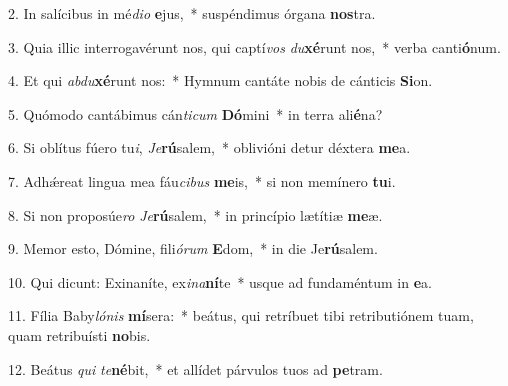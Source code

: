 2. In salícibus in mé\textit{di}\textit{o} \textbf{e}jus,~*  suspéndimus órgana \textbf{nos}tra.\

3. Quia illic interrogavérunt nos, qui captí\textit{vos} \textit{du}\textbf{xé}runt nos,~*  verba canti\textbf{ó}num.\

4. Et qui \textit{ab}\textit{du}\textbf{xé}runt nos:~*  Hymnum cantáte nobis de cánticis \textbf{Si}on.\

5. Quómodo cantábimus cán\textit{ti}\textit{cum} \textbf{Dó}mini~*  in terra ali\textbf{é}na?\

6. Si oblítus fúero tu\textit{i}, \textit{Je}\textbf{rú}salem,~*  oblivióni detur déxtera \textbf{me}a.\

7. Adhǽreat lingua mea fáu\textit{ci}\textit{bus} \textbf{me}is,~*  si non memínero \textbf{tu}i.\

8. Si non proposúe\textit{ro} \textit{Je}\textbf{rú}salem,~*  in princípio lætítiæ \textbf{me}æ.\

9. Memor esto, Dómine, fili\textit{ó}\textit{rum} \textbf{E}dom,~*  in die Je\textbf{rú}salem.\

10. Qui dicunt: Exinaníte, ex\textit{i}\textit{na}\textbf{ní}te~*  usque ad fundaméntum in \textbf{e}a.\

11. Fília Baby\textit{ló}\textit{nis} \textbf{mí}sera:~*  beátus, qui retríbuet tibi retributiónem tuam, quam retribuísti \textbf{no}bis.\

12. Beátus \textit{qui} \textit{te}\textbf{né}bit,~*  et allídet párvulos tuos ad \textbf{pe}tram.\

